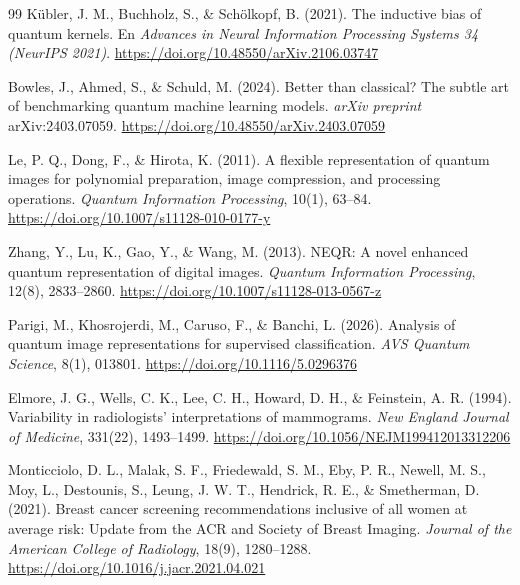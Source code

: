 \begin{thebibliography}{99}
    K\"ubler, J. M., Buchholz, S., \& Sch\"olkopf, B. (2021).
    The inductive bias of quantum kernels.
    En \textit{Advances in Neural Information Processing Systems 34 (NeurIPS 2021)}.
    \url{https://doi.org/10.48550/arXiv.2106.03747}

    Bowles, J., Ahmed, S., \& Schuld, M. (2024).
    Better than classical? The subtle art of benchmarking quantum machine learning models.
    \textit{arXiv preprint} arXiv:2403.07059.
    \url{https://doi.org/10.48550/arXiv.2403.07059}

    Le, P. Q., Dong, F., \& Hirota, K. (2011).
    A flexible representation of quantum images for polynomial preparation, image compression, and processing operations.
    \textit{Quantum Information Processing}, 10(1), 63--84.
    \url{https://doi.org/10.1007/s11128-010-0177-y}

    Zhang, Y., Lu, K., Gao, Y., \& Wang, M. (2013).
    NEQR: A novel enhanced quantum representation of digital images.
    \textit{Quantum Information Processing}, 12(8), 2833--2860.
    \url{https://doi.org/10.1007/s11128-013-0567-z}

    Parigi, M., Khosrojerdi, M., Caruso, F., \& Banchi, L. (2026).
    Analysis of quantum image representations for supervised classification.
    \textit{AVS Quantum Science}, 8(1), 013801.
    \url{https://doi.org/10.1116/5.0296376}


    Elmore, J. G., Wells, C. K., Lee, C. H., Howard, D. H., \& Feinstein, A. R. (1994).
    Variability in radiologists' interpretations of mammograms.
    \textit{New England Journal of Medicine}, 331(22), 1493--1499.
    \url{https://doi.org/10.1056/NEJM199412013312206}

    Monticciolo, D. L., Malak, S. F., Friedewald, S. M., Eby, P. R., Newell, M. S., Moy, L.,
    Destounis, S., Leung, J. W. T., Hendrick, R. E., \& Smetherman, D. (2021).
    Breast cancer screening recommendations inclusive of all women at average risk: Update from the ACR and Society of Breast Imaging.
    \textit{Journal of the American College of Radiology}, 18(9), 1280--1288.
    \url{https://doi.org/10.1016/j.jacr.2021.04.021}
\end{thebibliography}
